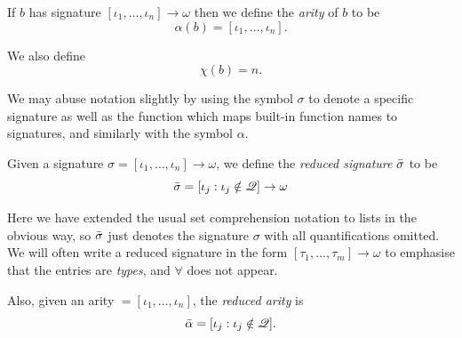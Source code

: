 \smallskip
\noindent If $b$ has signature $[\iota_1, \ldots, \iota_n] \rightarrow \omega$ then we define
the \textit{arity}  of $b$ to be
$$
\alpha(b) = [\iota_1, \ldots, \iota_n].
$$%

\noindent We also define
$$
  \chi(b) = n.
$$%

\noindent We may abuse notation slightly by using the symbol $\sigma$ to denote
a specific signature as well as the function which maps built-in function names
to signatures, and similarly with the symbol $\alpha$.

\medskip
\noindent Given a signature
$\sigma = [\iota_1, \ldots, \iota_n] \rightarrow \omega$,
we define the \textit{reduced signature} $\bar{\sigma}$ to be
$$
\bar{\sigma} = [\iota_j : \iota_j \notin \mathscr{Q}] \rightarrow \omega
$$%

\noindent Here we have extended the usual set comprehension notation to lists in the
obvious way, so $\bar{\sigma}$ just denotes the signature $\sigma$ with all
quantifications omitted. We will often write a reduced signature in the form
$[\tau_1, \ldots, \tau_m] \rightarrow \omega$ to emphasise that the entries are
\textit{types}, and $\mathbf{\forall}$ does not appear.

\medskip
\noindent Also, given an arity $= [\iota_1, \ldots, \iota_n]$, the \textit{reduced
  arity} is
$$
\bar{\alpha} = [\iota_j : \iota_j \notin \mathscr{Q}].
$$%

